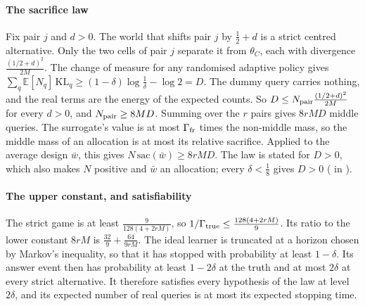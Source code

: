 \paragraph{The sacrifice law} Fix pair $j$ and $d>0$. The world that shifts pair $j$ by
$\frac12+d$ is a strict centred alternative. Only the two cells of pair $j$ separate it from
$\theta_{C}$, each with divergence $\frac{(1/2+d)^{2}}{2M}$. The change of measure for any
randomised adaptive policy gives
$\sum_{q}\mathbb{E}[N_{q}]\,\mathrm{KL}_{q}\ge(1-\delta)\log\frac1\delta-\log2=D$. The dummy
query carries nothing, and the real terms are the energy of the expected counts. So
$D\le N_{\rm pair}\frac{(1/2+d)^{2}}{2M}$ for every $d>0$, and $N_{\rm pair}\ge8MD$. Summing over
the $r$ pairs gives $8rMD$ middle queries. The surrogate's value is at most $\Gamma_{\rm fr}$
times the non-middle mass, so the middle mass of an allocation is at most its relative
sacrifice. Applied to the average design $\bar w$, this gives $N\,\mathrm{sac}(\bar w)\ge8rMD$.
The law is stated for $D>0$, which also makes $N$ positive and $\bar w$ an allocation; every
$\delta<\frac18$ gives $D>0$ ( in ).


\paragraph{The upper constant, and satisfiability} The strict game is at least
$\frac{9}{128(4+2rM)}$, so $1/\Gamma_{\rm true}\le\frac{128(4+2rM)}{9}$. Its ratio to the lower
constant $8rM$ is $\frac{32}{9}+\frac{64}{9rM}$. The ideal learner is truncated at a horizon
chosen by Markov's inequality, so that it has stopped with probability at least $1-\delta$. Its
answer event then has probability at least $1-2\delta$ at the truth and at most $2\delta$ at
every strict alternative. It therefore satisfies every hypothesis of the law at level
$2\delta$, and its expected number of real queries is at most its expected stopping time.


